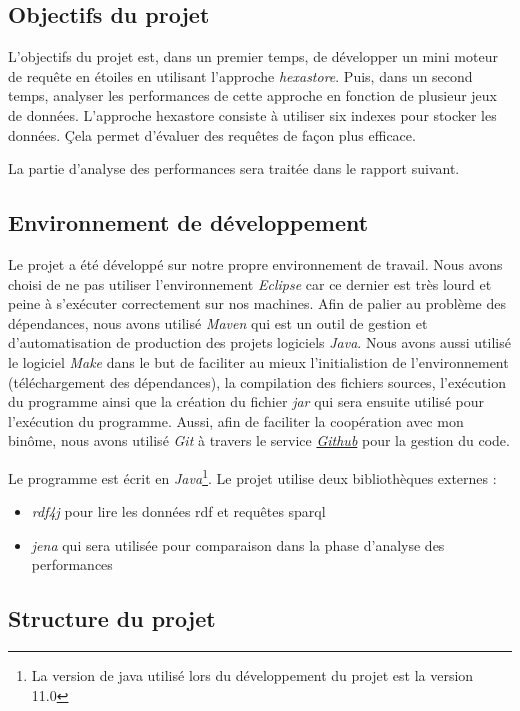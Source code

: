 \documentclass[12pt,titlepage]{article}
\begin{document}
\subsection*{Objectifs du projet}

L'objectifs du projet est, dans un premier temps, de développer un mini moteur de requête en étoiles en utilisant l'approche \textit{hexastore}. Puis, dans un second temps, analyser les performances de cette approche en fonction de plusieur jeux de données. L'approche hexastore consiste à utiliser six indexes pour stocker les données. Çela permet d'évaluer des requêtes de façon plus efficace. 

La partie d'analyse des performances sera traitée dans le rapport suivant.

\subsection*{Environnement de développement}

Le projet a été développé sur notre propre environnement de travail. Nous avons choisi de ne pas utiliser l'environnement \textit{Eclipse} car ce dernier est très lourd et peine à s'exécuter correctement sur nos machines. Afin de palier au problème des dépendances, nous avons utilisé \textit{Maven} qui est un outil de gestion et d'automatisation de production des projets logiciels \textit{Java}. Nous avons aussi utilisé le logiciel \textit{Make} dans le but de faciliter au mieux l'initialistion de l'environnement (téléchargement des dépendances), la compilation des fichiers sources, l'exécution du programme ainsi que la création du fichier \textit{jar} qui sera ensuite utilisé pour l'exécution du programme. Aussi, afin de faciliter la coopération avec mon binôme, nous avons utilisé \textit{Git} à travers le service \href{https://github.com/chakibreds/mtq_moteur_sparql}{\textit{Github}} pour la gestion du code. 

Le programme est écrit en \textit{Java}\footnote{La version de java utilisé lors du développement du projet est la version 11.0}. Le projet utilise deux bibliothèques externes :
\begin{itemize}
	\item \textit{rdf4j} pour lire les données rdf et requêtes sparql
	\item \textit{jena} qui sera utilisée pour comparaison dans la phase d’analyse des performances
\end{itemize}

\subsection*{Structure du projet}
\end{document}
